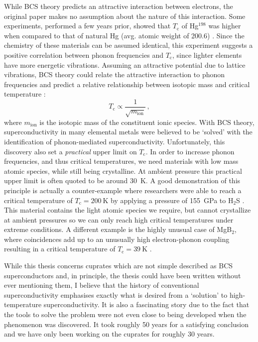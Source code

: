 While BCS theory predicts an attractive interaction between electrons, the original paper \cite{Bardeen1957} makes no assumption about the nature of this interaction. Some experiments, performed a few years prior, showed that $T_\text{c}$ of Hg$^{198}$ was higher when compared to that of natural Hg (avg. atomic weight of 200.6) \cite{Maxwell1950, Reynolds1950}. Since the chemistry of these materials can be assumed identical, this experiment suggests a positive correlation between phonon frequencies and $T_\text{c}$, since lighter elements have more energetic vibrations. Assuming an attractive potential due to lattice vibrations, BCS theory could relate the attractive interaction to phonon frequencies and predict a relative relationship between isotopic mass and critical temperature \cite{DeLaunay1954}:
%
\[ T_\text{c} \propto \frac{1}{\sqrt{m_\text{ion}}} \, , \]
%
where $m_\text{ion}$ is the isotopic mass of the constituent ionic species. With BCS theory, superconductivity in many elemental metals were believed to be `solved' with the identification of phonon-mediated superconductivity. Unfortunately, this discovery also set a \emph{practical} upper limit on $T_\text{c}$. In order to increase phonon frequencies, and thus critical temperatures, we need materials with low mass atomic species, while still being crystalline. At ambient pressure this practical upper limit is often quoted to be around \SI{30}{\kelvin}. A good demonstration of this principle is actually a counter-example where researchers were able to reach a critical temperature of $T_\text{c} = \SI{200}{\kelvin}$ by applying a pressure of \SI{155}{\giga\pascal} to H$_2$S \cite{Drozdov2015}. This material contains the light atomic species we require, but cannot crystallize at ambient pressures so we can only reach high critical temperatures under extreme conditions. A different example is the highly unusual case of MgB$_2$, where coincidences add up to an unusually high electron-phonon coupling resulting in a critical temperature of $T_\text{c} = \SI{39}{\kelvin}$ \cite{Nagamatsu2001}.

While this thesis concerns cuprates which are not simple described as BCS superconductors and, in principle, the thesis could have been written without ever mentioning them, I believe that the history of conventional superconductivity emphasises exactly what is desired from a `solution' to high-temperature superconductivity. It is also a fascinating story due to the fact that the tools to solve the problem were not even close to being developed when the phenomenon was discovered. It took roughly 50 years for a satisfying conclusion and we have only been working on the cuprates for roughly 30 years. 

